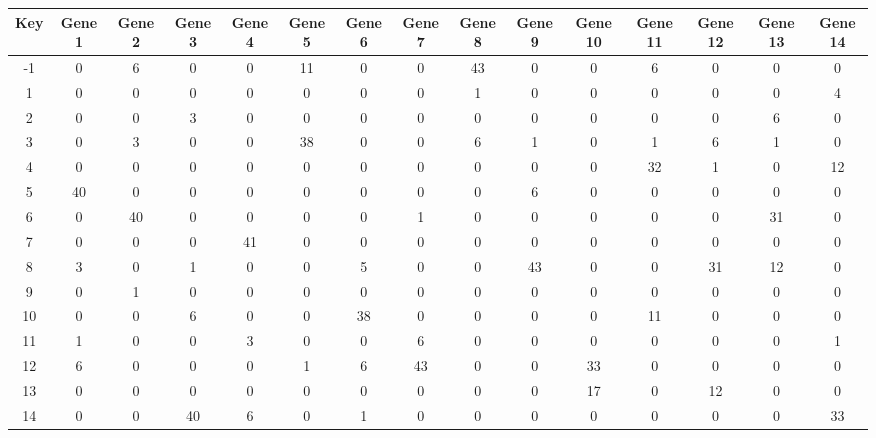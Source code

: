 \begin{tabular}{|c|c|c|c|c|c|c|c|c|c|c|c|c|c|c|}
\hline
Key & Gene 1 & Gene 2 & Gene 3 & Gene 4 & Gene 5 & Gene 6 & Gene 7 & Gene 8 & Gene 9 & Gene 10 & Gene 11 & Gene 12 & Gene 13 & Gene 14 \\
\hline
-1 & 0 & 6 & 0 & 0 & 11 & 0 & 0 & 43 & 0 & 0 & 6 & 0 & 0 & 0 \\
1 & 0 & 0 & 0 & 0 & 0 & 0 & 0 & 1 & 0 & 0 & 0 & 0 & 0 & 4 \\
2 & 0 & 0 & 3 & 0 & 0 & 0 & 0 & 0 & 0 & 0 & 0 & 0 & 6 & 0 \\
3 & 0 & 3 & 0 & 0 & 38 & 0 & 0 & 6 & 1 & 0 & 1 & 6 & 1 & 0 \\
4 & 0 & 0 & 0 & 0 & 0 & 0 & 0 & 0 & 0 & 0 & 32 & 1 & 0 & 12 \\
5 & 40 & 0 & 0 & 0 & 0 & 0 & 0 & 0 & 6 & 0 & 0 & 0 & 0 & 0 \\
6 & 0 & 40 & 0 & 0 & 0 & 0 & 1 & 0 & 0 & 0 & 0 & 0 & 31 & 0 \\
7 & 0 & 0 & 0 & 41 & 0 & 0 & 0 & 0 & 0 & 0 & 0 & 0 & 0 & 0 \\
8 & 3 & 0 & 1 & 0 & 0 & 5 & 0 & 0 & 43 & 0 & 0 & 31 & 12 & 0 \\
9 & 0 & 1 & 0 & 0 & 0 & 0 & 0 & 0 & 0 & 0 & 0 & 0 & 0 & 0 \\
10 & 0 & 0 & 6 & 0 & 0 & 38 & 0 & 0 & 0 & 0 & 11 & 0 & 0 & 0 \\
11 & 1 & 0 & 0 & 3 & 0 & 0 & 6 & 0 & 0 & 0 & 0 & 0 & 0 & 1 \\
12 & 6 & 0 & 0 & 0 & 1 & 6 & 43 & 0 & 0 & 33 & 0 & 0 & 0 & 0 \\
13 & 0 & 0 & 0 & 0 & 0 & 0 & 0 & 0 & 0 & 17 & 0 & 12 & 0 & 0 \\
14 & 0 & 0 & 40 & 6 & 0 & 1 & 0 & 0 & 0 & 0 & 0 & 0 & 0 & 33 \\
\hline
\end{tabular}